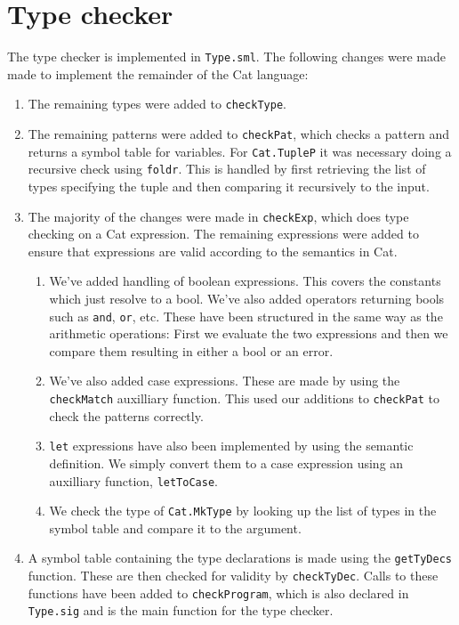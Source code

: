 \chapter{Type checker}

The type checker is implemented in \texttt{Type.sml}. The following changes
were made made to implement the remainder of the Cat language:

\begin{enumerate}
    \item {
        The remaining types were added to \texttt{checkType}.
    }
    \item {
        The remaining patterns were added to \texttt{checkPat}, which
        checks a pattern and returns a symbol table for variables. For
        \texttt{Cat.TupleP} it was necessary doing a recursive check using
        \texttt{foldr}. This is handled by first retrieving the list of types
        specifying the tuple and then comparing it recursively to the input.
    }
    \item {
        The majority of the changes were made in \texttt{checkExp}, which does
        type checking on a Cat expression. The remaining expressions were
        added to ensure that expressions are valid according to the semantics
        in Cat.
        \begin{enumerate}
        \item {
            We've added handling of boolean expressions. This covers the
            constants which just resolve to a bool. We've also added operators
            returning bools such as \texttt{and}, \texttt{or}, etc. These
            have been structured in the same way as the arithmetic operations:
            First we evaluate the two expressions and then we compare them
            resulting in either a bool or an error.
        }
        \item {
            We've also added case expressions. These are made by using the 
            \texttt{checkMatch} auxilliary function. This used our additions to
            \texttt{checkPat} to check the patterns correctly.
        }
        \item {
            \texttt{let} expressions have also been implemented by using the
            semantic definition. We simply convert them to a case expression
            using an auxilliary function, \texttt{letToCase}.
        }
        \item {
            We check the type of \texttt{Cat.MkType} by looking up the list of
            types in the symbol table and compare it to the argument.
        }
        \end{enumerate}
    }
    \item {
        A symbol table containing the type declarations is made using the
        \texttt{getTyDecs} function. These are then checked for validity by
        \texttt{checkTyDec}. Calls to these functions have been added to
        \texttt{checkProgram}, which is also declared in \texttt{Type.sig} and
        is the main function for the type checker.
    }
\end{enumerate}
